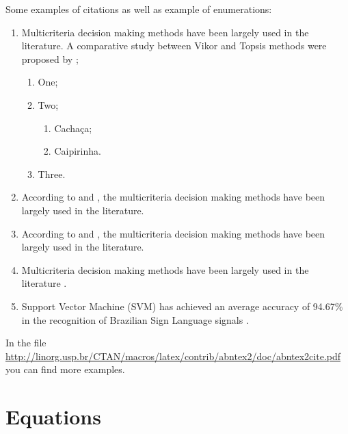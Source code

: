 Some examples of  citations as well as example of enumerations:

\begin{enumerate}%
\itemsep0em %
    \item Multicriteria decision making methods have been largely used in the literature. A comparative study between Vikor and Topsis methods were proposed by \cite{opricovic2004comparative};
    
    \begin{enumerate}
    \itemsep0em 
        \item One;
        \item Two;
        
        \begin{enumerate}
        \itemsep0em 
            \item Cachaça;
            \item Caipirinha.
        \end{enumerate}
        
        \item Three.
    \end{enumerate}
    
    \item According to \cite{Babington1993book,Harwood1993mastersthesis} and \cite{Joslin1993thesis}, the multicriteria decision making methods have been largely used in the literature. 
    \item According to \cite{Babington1993book} and \cite{opricovic2004comparative}, the multicriteria decision making methods have been largely used in the literature. %
    \item Multicriteria decision making methods have been largely used in the literature \citep{Isley1990misc,Babington1993book,Adams1993journal,opricovic2004comparative}.
    \item Support Vector Machine (SVM) has achieved an average accuracy of 94.67\% in the recognition of Brazilian Sign Language signals \citep{rezende2017analise}.
\end{enumerate}

In the file \url{http://linorg.usp.br/CTAN/macros/latex/contrib/abntex2/doc/abntex2cite.pdf} you can find more examples.


\section{Equations}

